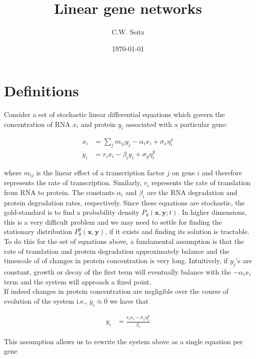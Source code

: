 \documentclass{article}
\title{Linear gene networks}
\author{C.W. Seitz}
\date{\today}
\begin{document}
\maketitle

\section{Definitions}

Consider a set of stochastic linear differential equations which govern the concentration of RNA $x_{i}$ and protein $y_{i}$ associated with a particular gene:

\begin{align*}
\dot{x_{i}} &= \sum_{j}m_{ij}y_{j} - \alpha_{i} x_{i} + \sigma_{x}\eta_{i}^{x}\\
\dot{y_{i}} &= r_{i}x_{i} - \beta_{i}y_{i} + \sigma_{y}\eta_{i}^{y}
\end{align*}

where $m_{ij}$ is the linear effect of a transcription factor $j$ on gene $i$ and therefore represents the rate of transcription. Similarly, $r_{i}$ represents the rate of translation from RNA to protein. The constants $\alpha_{i}$ and $\beta_{i}$ are the RNA degradation and protein degradation rates, respectively. Since these equations are stochastic, the gold-standard is to find a probability density $P_{\theta}(\bm{x},\bm{y}; t)$. In higher dimensions, this is a very difficult problem and we may need to settle for finding the stationary distribution $P_{\theta}^{0}(\bm{x},\bm{y})$, if it exists and finding its solution is tractable. To do this for the set of equations above, a fundamental assumption is that the rate of translation and protein degradation approximately balance and the timescale of of changes in protein concentration is very long. Intuitively, if $y_{j}$'s are constant, growth or decay of the first term will eventually balance with the $-\alpha_{i}x_{i}$ term and the system will approach a fixed point.
\vspace{0.1in}
\\If indeed changes in protein concentration are negligible over the course of evolution of the system i.e., $\dot{y_{i}} \approx 0$ we have that

\begin{align*}
y_{i} &= \frac{r_{i}x_{i} - \sigma_{x}\eta_{i}^{y}}{\beta_{i}}
\end{align*}

This assumption allows us to rewrite the system above as a single equation per gene
\end{document}
